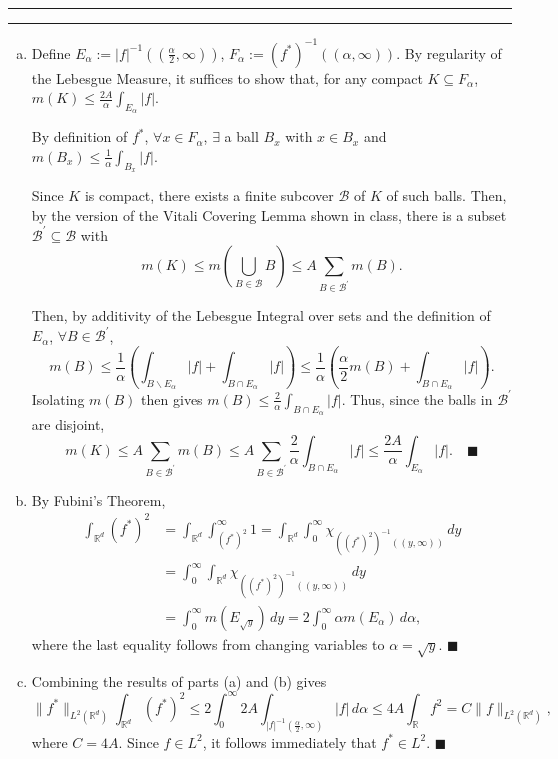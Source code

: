 \documentclass[11pt]{article}
\newcounter{questionCounter}
\newcounter{partCounter}[questionCounter]
\newenvironment{question}[2][\arabic{questionCounter}]{%
    \setcounter{partCounter}{0}%
    \vspace{.25in} \hrule \vspace{0.5em}%
        \noindent{\bf #2}%
    \vspace{0.8em} \hrule \vspace{.10in}%
    \addtocounter{questionCounter}{1}%
}{}
\renewcommand{\qed}{\quad $\blacksquare$}
\newcommand{\mqed}{\quad \blacksquare}
\newcommand{\inv}{^{-1}}
\newcommand{\sminus}{\backslash}
\newcommand{\R}{\mathbb{R}} %
\newcommand{\B}{\mathcal{B}}
\renewcommand{\'}{^{\prime}}
\begin{document}
\begin{question}{Page 260, Problem 6}
\begin{enumerate}[(a)]
\item Define $E_{\alpha} := |f|\inv((\frac{\alpha}{2},\infty))$, $F_{\alpha} :=
(f^*)\inv((\alpha,\infty))$.
By regularity of the Lebesgue Measure, it suffices to show that, for any
compact $K \subseteq F_{\alpha}$, $m(K) \leq \frac{2A}{\alpha}
\int_{E_{\alpha}} |f|$.

By definition of $f^*$, $\forall x \in F_{\alpha}$, $\exists$ a ball $B_x$ with
$x \in B_x$ and $m(B_x) \leq \frac{1}{\alpha} \int_{B_x} |f|$.

Since $K$ is compact, there exists a finite subcover $\B$ of $K$ of such balls.
Then, by the version of the Vitali Covering Lemma shown in class, there is a
subset $\B\' \subseteq \B$ with
\[m(K)
 \leq m\left( \bigcup_{B \in \B} B \right)
 \leq A \sum_{B \in \B\'} m(B).\]

Then, by additivity of the Lebesgue Integral over sets and the definition of
$E_{\alpha}$, $\forall B \in \B\'$,
\[
m(B)
 \leq \frac{1}{\alpha} \left( \int_{B \sminus E_{\alpha}} |f|
                                     + \int_{B \cap E_{\alpha}} |f| \right)
 \leq \frac{1}{\alpha} \left( \frac{\alpha}{2} m(B)
                                     + \int_{B \cap E_{\alpha}} |f| \right).
\]
Isolating $m(B)$ then gives $m(B) \leq \frac{2}{\alpha}
\int_{B \cap E_{\alpha}} |f|$. Thus, since the balls in $\B\'$ are disjoint,
\[
m(K)
 \leq A \sum_{B \in \B\'} m(B)
 \leq A\sum_{B \in \B\'} \frac{2}{\alpha} \int_{B \cap E_{\alpha}} |f|
 \leq \frac{2A}{\alpha} \int_{E_{\alpha}} |f|. \mqed
\]

\item By Fubini's Theorem,
\begin{align*}
\int_{\R^d} (f^*)^2
 & = \int_{\R^d} \int_{(f^*)^2}^{\infty} 1
   = \int_{\R^d} \int_0^{\infty} \chi_{((f^*)^2)\inv((y,\infty))} \, dy \\
 & = \int_0^{\infty} \int_{\R^d} \chi_{((f^*)^2)\inv((y,\infty))} \, dy \\
 & = \int_0^{\infty} m(E_{\sqrt{y}}) \, dy
   = 2\int_0^{\infty} \alpha m(E_{\alpha}) \, d\alpha,
\end{align*}
where the last equality follows from changing variables to $\alpha = \sqrt{y}$.
\qed

\item Combining the results of parts (a) and (b) gives
\[\|f^*\|_{L^2(\R^d)}\int_{\R^d} (f^*)^2
 \leq 2\int_0^{\infty} 2A \int_{|f|\inv(\frac{\alpha}{2},\infty)} |f|
                                                                    \, d\alpha
 \leq 4A \int_{\R} f^2
 = C \|f\|_{L^2(\R^d)},
\]
where $C = 4A$. Since $f \in L^2$, it follows immediately that $f^* \in L^2$.
\qed
\end{enumerate}
\end{question}
\end{document}
